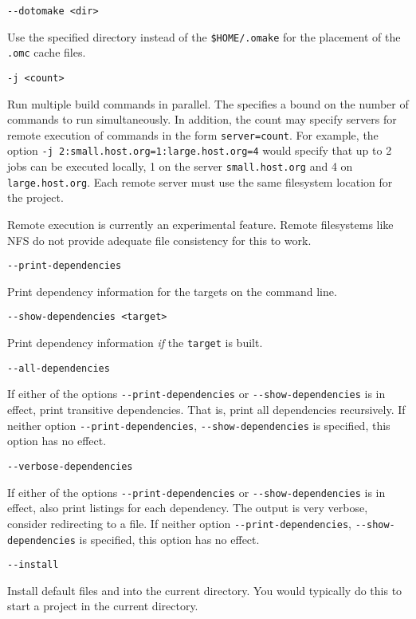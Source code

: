  \verb+--dotomake <dir>+

Use the specified directory instead of the \verb+$HOME/.omake+
for the placement of the \verb+.omc+ cache files.

 \verb+-j <count>+

Run multiple build commands in parallel.  The  specifies a
bound on the number of commands to run simultaneously.  In addition, the count may specify servers
for remote execution of commands in the form \verb+server=count+.  For example, the option
\verb+-j 2:small.host.org=1:large.host.org=4+ would specify that up to 2 jobs can be executed
locally, 1 on the server \verb+small.host.org+ and 4 on \verb+large.host.org+.  Each remote server
must use the same filesystem location for the project.

Remote execution is currently an experimental feature.  Remote filesystems like NFS do not provide
adequate file consistency for this to work.

 \verb+--print-dependencies+

Print dependency information for the targets on the command line.

 \verb+--show-dependencies <target>+

Print dependency information \emph{if} the \verb+target+ is built.

 \verb+--all-dependencies+

If either of the options \texttt{-{}-print-dependencies} or
\texttt{-{}-show-dependencies} is in effect, print transitive dependencies.  That is, print all
dependencies recursively.  If neither option \texttt{-{}-print-dependencies},
\texttt{-{}-show-dependencies} is specified, this option has no effect.

 \verb+--verbose-dependencies+

If either of the options \texttt{-{}-print-dependencies} or
\texttt{-{}-show-dependencies} is in effect, also print listings for each dependency.  The output is
very verbose, consider redirecting to a file.  If neither option \texttt{-{}-print-dependencies},
\texttt{-{}-show-dependencies} is specified, this option has no effect.

 \verb+--install+

Install default files  and  into the current directory.  You would
typically do this to start a project in the current directory.

